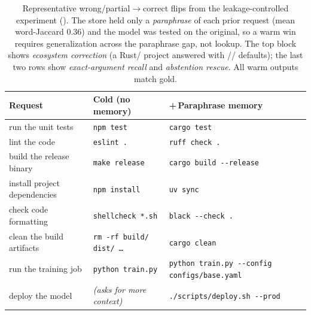 \begin{table}[t]
\centering
\footnotesize
\begin{tabular}{@{}lll@{}}
\toprule
\textbf{Request} & \textbf{Cold (no memory)} & \textbf{+\,Paraphrase memory} \\
\midrule
run the unit tests             & \texttt{npm test}                & \texttt{cargo test} \\
lint the code                  & \texttt{eslint .}                & \texttt{ruff check .} \\
build the release binary       & \texttt{make release}            & \texttt{cargo build -{}-release} \\
install project dependencies   & \texttt{npm install}             & \texttt{uv sync} \\
check code formatting          & \texttt{shellcheck *.sh}         & \texttt{black -{}-check .} \\
clean the build artifacts      & \texttt{rm -rf build/ dist/ \dots} & \texttt{cargo clean} \\
run the training job           & \texttt{python train.py}         & \texttt{python train.py -{}-config configs/base.yaml} \\
deploy the model               & \textit{(asks for more context)} & \texttt{./scripts/deploy.sh -{}-prod} \\
\bottomrule
\end{tabular}
\caption{Representative wrong/partial$\rightarrow$correct flips from the
leakage-controlled experiment (). The store held only a
\emph{paraphrase} of each prior request (mean word-Jaccard 0.36) and the model was tested
on the original, so a warm win requires generalization across the paraphrase gap, not
lookup. The top block shows \emph{ecosystem correction} (a Rust/ project
answered with // defaults); the last two rows
show \emph{exact-argument recall} and \emph{abstention rescue}. All warm outputs match
gold.}
\label{tab:lift-examples}
\end{table}

